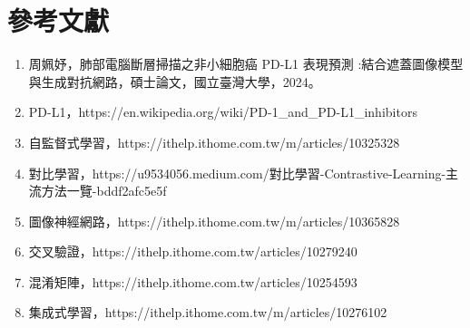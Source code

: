 \documentclass[12pt,a4paper]{article}
\begin{document}
\section{參考文獻}
\begin{enumerate}
    \item 周姵妤，肺部電腦斷層掃描之非小細胞癌 PD-L1 表現預測 :結合遮蓋圖像模型與生成對抗網路，碩士論文，國立臺灣大學，2024。
    \item PD-L1，https://en.wikipedia.org/wiki/PD-1\_and\_PD-L1\_inhibitors
    \item 自監督式學習，https://ithelp.ithome.com.tw/m/articles/10325328
    \item 對比學習，https://u9534056.medium.com/對比學習-Contrastive-Learning-主流方法一覽-bddf2afc5e5f
    \item 圖像神經網路，https://ithelp.ithome.com.tw/m/articles/10365828
    \item 交叉驗證，https://ithelp.ithome.com.tw/articles/10279240
    \item 混淆矩陣，https://ithelp.ithome.com.tw/articles/10254593
    \item 集成式學習，https://ithelp.ithome.com.tw/m/articles/10276102
\end{enumerate}
\end{document}
